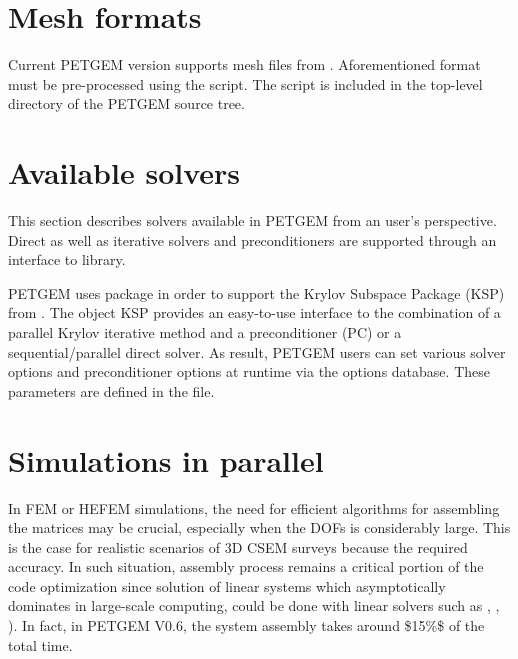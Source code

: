 \documentclass[letterpaper,10pt,english]{sphinxmanual}
\begin{document}
\section{Mesh formats}
\label{\detokenize{Manual:mesh-formats}}\label{\detokenize{Manual:id5}}
Current PETGEM version supports mesh files from
. Aforementioned format must be pre-processed
using the  script. The 
script is included in the top-level directory of the PETGEM source tree.


\section{Available solvers}
\label{\detokenize{Manual:available-solvers}}\label{\detokenize{Manual:id6}}
This section describes solvers available in PETGEM from an user’s perspective.
Direct as well as iterative solvers and preconditioners are supported
through an interface to  library.

PETGEM uses  package in
order to support the Krylov Subspace Package (KSP) from
. The object KSP provides an
easy-to-use interface to the combination of a parallel Krylov iterative method
and a preconditioner (PC) or a sequential/parallel direct solver. As result,
PETGEM users can set various solver options and preconditioner
options at runtime via the  options
database. These parameters are defined in the  file.


\section{Simulations in parallel}
\label{\detokenize{Manual:simulations-in-parallel}}\label{\detokenize{Manual:id7}}
In FEM or HEFEM simulations, the need for efficient algorithms for assembling the
matrices may be crucial, especially when the DOFs is considerably large. This
is the case for realistic scenarios of 3D CSEM surveys because the required
accuracy. In such situation, assembly process remains a critical portion of
the code optimization since solution of linear systems which asymptotically
dominates in large-scale computing, could be done with linear solvers such
as ,
,
). In fact, in PETGEM V0.6,
the system assembly takes around \$15\%\$ of the total time.
\end{document}
